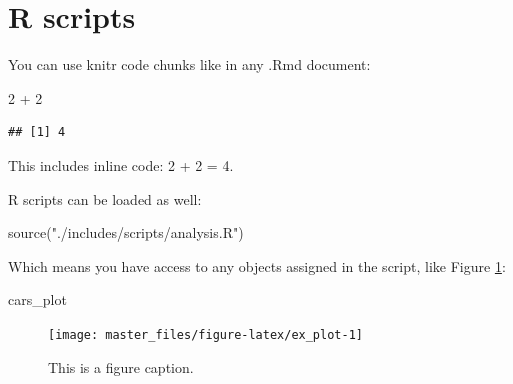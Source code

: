 \documentclass[a4paper,11pt,twocolumn]{article}
\newenvironment{Shaded}{\begin{snugshade}}{\end{snugshade}}
\newcommand{\KeywordTok}[1]{\textcolor[rgb]{0.94,0.87,0.69}{#1}}
\newcommand{\DecValTok}[1]{\textcolor[rgb]{0.86,0.86,0.80}{#1}}
\newcommand{\StringTok}[1]{\textcolor[rgb]{0.80,0.58,0.58}{#1}}
\newcommand{\OperatorTok}[1]{\textcolor[rgb]{0.94,0.94,0.82}{#1}}
\newcommand{\NormalTok}[1]{\textcolor[rgb]{0.80,0.80,0.80}{#1}}
\begin{document}
\section{R scripts}

You can use knitr code chunks like in any .Rmd document:

\begin{Shaded}
\begin{Highlighting}[]
\DecValTok{2} \OperatorTok{+}\StringTok{ }\DecValTok{2}
\end{Highlighting}
\end{Shaded}

\begin{verbatim}
## [1] 4
\end{verbatim}

This includes inline code: 2 + 2 = 4.

R scripts can be loaded as well:

\begin{Shaded}
\begin{Highlighting}[]
\KeywordTok{source}\NormalTok{(}\StringTok{"./includes/scripts/analysis.R"}\NormalTok{)}
\end{Highlighting}
\end{Shaded}

Which means you have access to any objects assigned in the script, like
Figure \ref{fig:ex_plot}:

\begin{Shaded}
\begin{Highlighting}[]
\NormalTok{cars_plot}
\end{Highlighting}
\end{Shaded}

\begin{figure}[h]

{\centering \texttt{[image: master\_files/figure-latex/ex\_plot-1]} 

}

\caption{This is a figure caption.}\label{fig:ex_plot}
\end{figure}



\theendnotes
\end{document}
